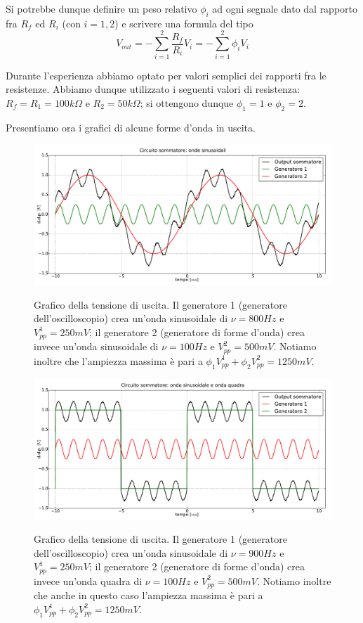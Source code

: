 Si potrebbe dunque definire un peso relativo $\phi_i$ ad ogni segnale dato dal rapporto fra $R_f$ ed $R_{i}$ (con $i=1,2$) e scrivere una formula del tipo
$$V_{out}=-\sum^{2}_{i=1} \frac{R_f}{R_{i}}V_{i}=-\sum^{2}_{i=1} \phi_i V_{i}$$

Durante l'esperienza abbiamo optato per valori semplici dei rapporti fra le resistenze. Abbiamo dunque utilizzato i seguenti valori di resistenza: $R_f=R_1=100 k\Omega$ e $R_2=50 k\Omega$; si ottengono dunque $\phi_1=1$ e $\phi_2=2$.

Presentiamo ora i grafici di alcune forme d'onda in uscita.

\begin{figure}[ht]
 \centering
   {\includegraphics[width=18cm]{../E01/latex/sinsin.pdf}}
 \caption{Grafico della tensione di uscita. Il generatore 1 (generatore dell'oscilloscopio) crea un'onda sinusoidale di $\nu=800 Hz$ e $V^1_{pp}=250 mV$; il generatore 2 (generatore di forme d'onda) crea invece un'onda sinusoidale di $\nu=100 Hz$ e $V^2_{pp}=500 mV$. Notiamo inoltre che l'ampiezza massima è pari a $\phi_1 V^1_{pp}+\phi_2 V^2_{pp}=1250 mV$.}
 \label{gr:onde1}
\end{figure}

\begin{figure}[ht]
 \centering
   {\includegraphics[width=18cm]{../E01/latex/sinquad.pdf}}
 \caption{Grafico della tensione di uscita. Il generatore 1 (generatore dell'oscilloscopio) crea un'onda sinusoidale di $\nu=900 Hz$ e $V^1_{pp}=250 mV$; il generatore 2 (generatore di forme d'onda) crea invece un'onda quadra di $\nu=100 Hz$ e $V^2_{pp}=500 mV$. Notiamo inoltre che anche in questo caso l'ampiezza massima è pari a $\phi_1 V^1_{pp}+\phi_2 V^2_{pp}=1250 mV$.}
 \label{gr:onde2}
\end{figure}